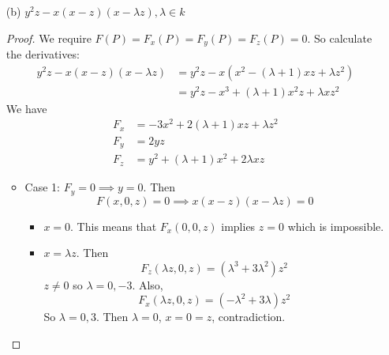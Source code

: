 \documentclass{article}
\begin{document}
\begin{itemize}
        \item [(b)] $y^{2}z - x(x - z)(x - \lambda z), \lambda \in k$
            \begin{proof}
                We require $F(P) = F_{x}(P) = F_{y}(P) = F_{z}(P) = 0$. So calculate the derivatives:
                    \begin{align*}
                        y^{2}z - x(x - z)(x - \lambda z) &= y^{2}z - x(x^{2} - (\lambda + 1)xz + \lambda z^{2}) \\
                                                         &= y^{2}z - x^{3} + (\lambda + 1)x^{2}z + \lambda xz^{2}
                    \end{align*}
                We have
                    \begin{align*}
                        F_{x} &= -3x^{2} + 2(\lambda + 1)xz + \lambda z^{ 2} \\
                        F_{y} &= 2yz                                         \\
                        F_{z} &= y^{2} + (\lambda + 1)x^{2} + 2\lambda xz
                    \end{align*}
                    \begin{itemize}
                        \item Case 1: $F_{y} = 0 \implies y = 0$. Then 
                            \begin{equation*}
                                F(x, 0, z) = 0 \implies x( x - z)(x - \lambda z) = 0
                            \end{equation*}
                                \begin{itemize}
                                    \item $x = 0$. This means that $F_{x}(0, 0, z)$ implies $z = 0$ which is impossible.

                                    \item $x = \lambda z$. Then
                                        \begin{equation*}
                                            F_{z}(\lambda z, 0, z) = (\lambda^{ 3} + 3\lambda^{ 2})z^{2}
                                        \end{equation*}
                                    $z \neq 0$ so $\lambda = 0, -3$. Also,
                                        \begin{equation*}
                                            F_{x}(\lambda z, 0, z) = (-\lambda^{ 2} + 3\lambda)z^{2}
                                        \end{equation*}
                                    So $\lambda = 0, 3$. Then $\lambda = 0$, $x = 0 = z$, contradiction.
                                \end{itemize}


\end{itemize}
\end{proof}
\end{itemize}
\end{document}
